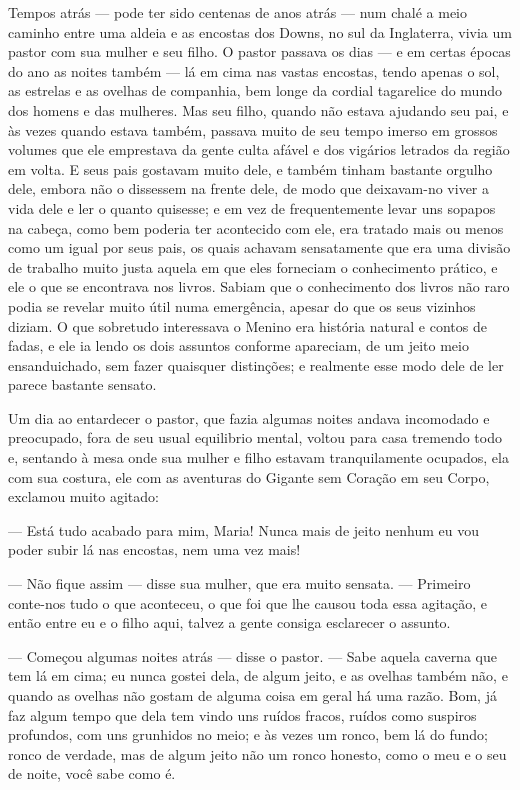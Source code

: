 Tempos atrás — pode ter sido centenas de anos atrás — num chalé a meio
caminho entre uma aldeia e as encostas dos Downs, no sul da
Inglaterra, vivia um pastor com sua mulher e seu filho. O pastor
passava os dias — e em certas épocas do ano as noites também — lá em
cima nas vastas encostas, tendo apenas o sol, as estrelas e as
ovelhas de companhia, bem longe da cordial tagarelice do mundo dos
homens e das mulheres. Mas seu filho, quando não estava ajudando seu
pai, e às vezes quando estava também, passava muito de seu tempo
imerso em grossos volumes que ele emprestava da gente culta afável e
dos vigários letrados da região em volta. E seus pais gostavam muito
dele, e também tinham bastante orgulho dele, embora não o dissessem
na frente dele, de modo que deixavam-no viver a vida dele e ler o
quanto quisesse; e em vez de frequentemente levar uns sopapos na
cabeça, como bem poderia ter acontecido com ele, era tratado mais ou
menos como um igual por seus pais, os quais achavam sensatamente que
era uma divisão de trabalho muito justa aquela em que eles forneciam
o conhecimento prático, e ele o que se encontrava nos livros. Sabiam
que o conhecimento dos livros não raro podia se revelar muito útil
numa emergência, apesar do que os seus vizinhos diziam. O que
sobretudo interessava o Menino era história natural e contos de
fadas, e ele ia lendo os dois assuntos conforme apareciam, de um
jeito meio ensanduichado, sem fazer quaisquer distinções; e realmente
esse modo dele de ler parece bastante sensato.

Um dia ao entardecer o pastor, que fazia algumas noites andava
incomodado e preocupado, fora de seu usual equilibrio mental, voltou
para casa tremendo todo e, sentando à mesa onde sua mulher e filho
estavam tranquilamente ocupados, ela com sua costura, ele com as
aventuras do Gigante sem Coração em seu Corpo, exclamou muito
agitado:

— Está tudo acabado para mim, Maria! Nunca mais de jeito nenhum eu vou
poder subir lá nas encostas, nem uma vez mais!

— Não fique assim — disse sua mulher, que era muito sensata. —
Primeiro conte-nos tudo o que aconteceu, o que foi que lhe causou
toda essa agitação, e então entre eu e o filho aqui, talvez a gente
consiga esclarecer o assunto.

— Começou algumas noites atrás — disse o pastor. — Sabe aquela caverna
que tem lá em cima; eu nunca gostei dela, de algum jeito, e as
ovelhas também não, e quando as ovelhas não gostam de alguma coisa em
geral há uma razão. Bom, já faz algum tempo que dela tem vindo uns
ruídos fracos, ruídos como suspiros profundos, com uns grunhidos no
meio; e às vezes um ronco, bem lá do fundo; ronco de verdade, mas de
algum jeito não um ronco honesto, como o meu e o seu de noite, você
sabe como é.

